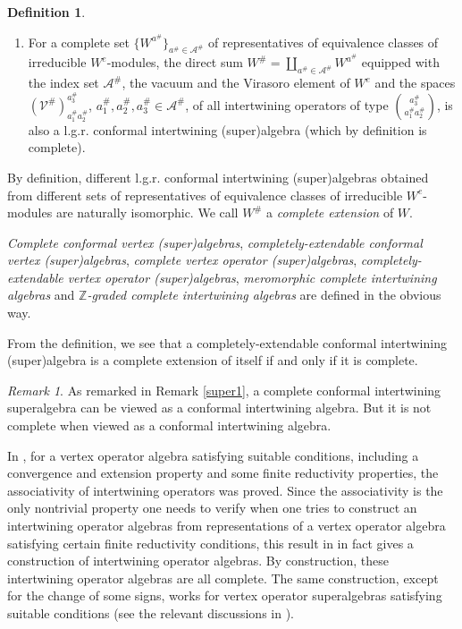 \documentclass{amsproc}
\theoremstyle{definition}
\newtheorem{defn}[thm]{Definition}
\theoremstyle{remark}
\newtheorem{rema}[thm]{Remark}
\numberwithin{equation}{section}
\begin{document}
\begin{defn}
{\begin{enumerate}
\item For a complete set 
$\{W^{a^{\#}}\}_{a^{\#}\in \mathcal{A}^{\#}}$
of representatives  of
equivalence classes of
irreducible $W^{e}$-modules, the direct sum $W^{\#}=\coprod_{a^{\#}\in 
\mathcal{A}^{\#}}W^{a^{\#}}$
equipped with the index set $\mathcal{A}^{\#}$,
the vacuum and 
the Virasoro element of $W^{e}$ and the spaces 
$(\mathcal{V}^{\#})_{a_{1}^{\#}a_{2}^{\#}}^{a_{3}^{\#}}$,
$a_{1}^{\#}, a_{2}^{\#}, a_{3}^{\#}\in \mathcal{A}^{\#}$, of all 
intertwining operators of type $\binom{a_{3}^{\#}}{a_{1}^{\#}a_{2}^{\#}}$, 
is also a l.g.r. conformal
intertwining (super)algebra (which 
by definition is complete). 

\end{enumerate}

By definition, different 
l.g.r. conformal
intertwining (super)algebras obtained from different sets of representatives
of equivalence classes of
irreducible $W^{e}$-modules are naturally isomorphic. We 
 call $W^{\#}$ a
{\it complete extension} of $W$.

{\it Complete conformal vertex
(super)algebras}, {\it completely-extendable conformal vertex
(super)algebras}, {\it complete
vertex operator (super)algebras}, {\it completely-extendable vertex
operator (super)algebras}, {\it meromorphic complete intertwining
algebras} and {\it $\mathbb{Z}$-graded complete intertwining
algebras}
 are defined in the 
obvious way. }
\end{defn}

From the definition, we see that a completely-extendable conformal 
intertwining (super)algebra
is a complete extension of itself if and only if it is complete.

\begin{rema}\label{super2}
{\rm As remarked in Remark \ref{super1}, a complete 
conformal intertwining 
superalgebra can be viewed as a conformal intertwining algebra. 
But it is not complete when viewed as a conformal intertwining algebra.}
\end{rema}


In \cite{H1}, for a vertex operator algebra 
satisfying suitable
conditions, including a convergence and extension property and 
some finite reductivity properties,
the associativity of
intertwining operators 
was proved. Since the associativity is the only nontrivial 
property one needs to verify when one tries to construct 
an intertwining operator algebras from representations of 
a vertex operator algebra satisfying certain finite reductivity
conditions, this result in \cite{H1}
in fact gives a construction of intertwining operator algebras. 
By construction, 
these intertwining operator algebras 
are all complete. The same construction, except
for the change of some signs, works for 
vertex operator superalgebras satisfying suitable conditions (see 
the relevant discussions in \cite{HM1}). 
\end{document}
